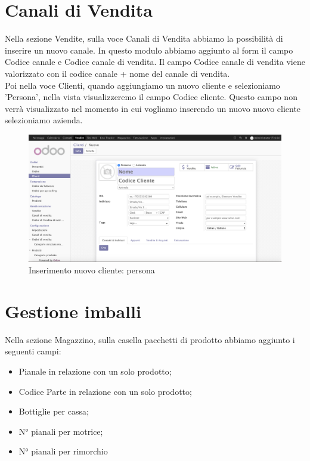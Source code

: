 \newpage
\section{Canali di Vendita}
Nella sezione Vendite, sulla voce Canali di Vendita abbiamo la possibilità di inserire un nuovo canale.
In questo modulo abbiamo aggiunto al form il campo Codice canale e Codice canale di vendita.
Il campo Codice canale di vendita viene valorizzato con il codice canale + nome del canale di vendita.\\
Poi nella voce Clienti, quando aggiungiamo un nuovo cliente e selezioniamo 'Persona', nella vista visualizzeremo il campo Codice cliente. Questo campo non verrà visualizzato nel momento in cui vogliamo inserendo un nuovo nuovo cliente selezioniamo azienda.

\begin{figure}[H]
	\begin{center} \includegraphics[scale=0.3]{figures/ibg_code}
		\caption[Inserimento nuovo cliente: persona]{Inserimento nuovo cliente: persona}
		\label{fig:ibg_code}
	\end{center}
\end{figure}
\newpage

\section{Gestione imballi}
Nella sezione Magazzino, sulla casella pacchetti di prodotto abbiamo aggiunto i seguenti campi:
\begin{itemize}
\item Pianale in relazione con un solo prodotto;
\item Codice Parte in relazione con un solo prodotto;
\item Bottiglie per cassa;
\item N° pianali per motrice;
\item N° pianali per rimorchio
\end{itemize}

